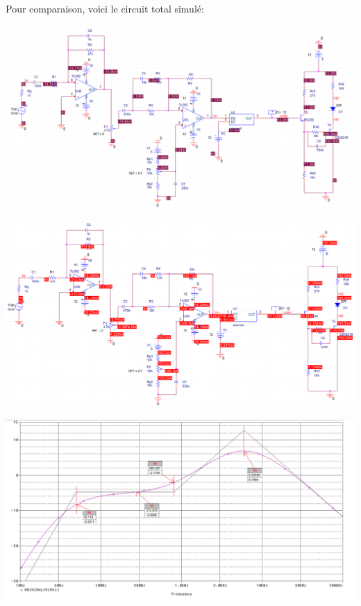 Pour comparaison, voici le circuit total simulé:

\includegraphics[width=\linewidth]{../img/circuit_emetteur_bias_point_tension.png}

\includegraphics[width=\linewidth]{../img/circuit_emetteur_bias_point_courant.png}

\includegraphics[width=\linewidth]{../img/bode_circuit_audio_simu.png}
